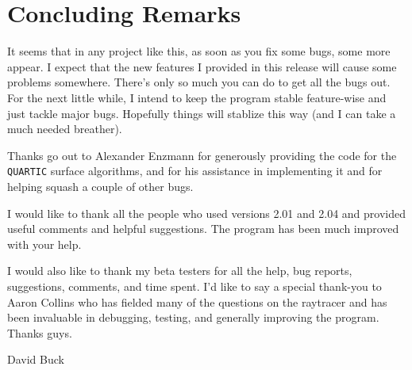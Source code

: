 \chapter{Concluding Remarks}

It seems that in any project like this, as soon as you fix some bugs,
some more appear.  I expect that the new features I provided in this
release will cause some problems somewhere.  There's only so much you
can do to get all the bugs out.  For the next little while, I intend
to keep the program stable feature-wise and just tackle major bugs.
Hopefully things will stablize this way (and I can take a much needed
breather).

Thanks go out to Alexander Enzmann for
generously providing the code
for the {\tt QUARTIC} surface algorithms, and for his assistance in
implementing it and for helping squash a couple of other bugs.

I would like to thank all the people who used versions 2.01 and 2.04
and provided useful comments and helpful suggestions.  The program has
been much improved with your help.

I would also like to thank my beta testers for all the help, bug
reports, suggestions, comments, and time spent.  I'd like to say a
special thank-you to Aaron Collins who has
fielded many of the
questions on the raytracer and has been invaluable in debugging,
testing, and generally improving the program.  Thanks guys.

\vskip 0.5in
\hfill David Buck
